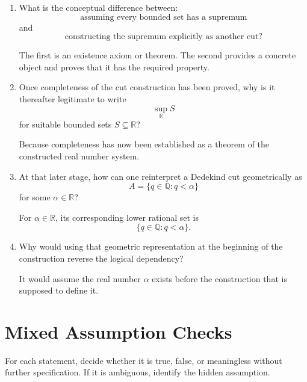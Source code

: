 \documentclass{self-check}
\begin{document}
\begin{enumerate}[label=\arabic*., itemsep=10pt]
\item What is the conceptual difference between:
\[
\text{assuming every bounded set has a supremum}
\]
and
\[
\text{constructing the supremum explicitly as another cut}?
\]

\begin{answer}
The first is an existence axiom or theorem. The second provides a concrete object and proves that it has the required property.
\end{answer}

\item Once completeness of the cut construction has been proved, why is it thereafter legitimate to write
\[
\sup_{\mathbb{R}} S
\]
for suitable bounded sets $S\subseteq\mathbb{R}$?

\begin{answer}
Because completeness has now been established as a theorem of the constructed real number system.
\end{answer}

\item At that later stage, how can one reinterpret a Dedekind cut geometrically as
\[
A=\{q\in\mathbb{Q}:q<\alpha\}
\]
for some $\alpha\in\mathbb{R}$?

\begin{answer}
For $\alpha\in\mathbb{R}$, its corresponding lower rational set is
\[
\{q\in\mathbb{Q}:q<\alpha\}.
\]
\end{answer}

\item Why would using that geometric representation at the beginning of the construction reverse the logical dependency?

\begin{answer}
It would assume the real number $\alpha$ exists before the construction that is supposed to define it.
\end{answer}

\end{enumerate}

\section{Mixed Assumption Checks}

For each statement, decide whether it is true, false, or meaningless without further specification.
If it is ambiguous, identify the hidden assumption.
\end{document}
